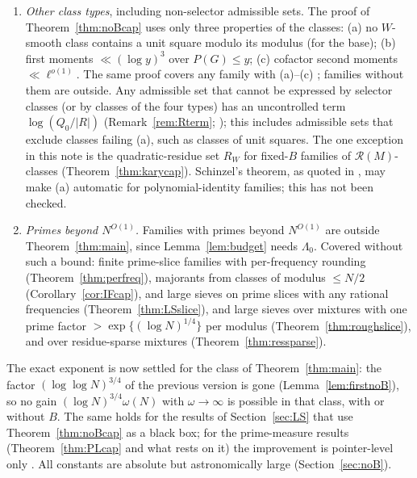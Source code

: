 \documentclass[10pt,reqno]{amsart}
\theoremstyle{definition}
\theoremstyle{remark}
\newcommand{\cR}{\mathscr R}
\begin{document}
\begin{enumerate}
  non-witness divisor information along fixed shifts, tuple counts whose
  main term is not the CRT density (any $\theta>3/4$ input of this kind
  for the prime family needs accuracy at moduli $\exp\{c(\log N)^{3\theta/2}\}$,
  see the discussion after Corollary~\ref{cor:prime23}), and family-class order $k$ in the window
  \eqref{eq:window} for families whose moduli have unboundedly many
  primes above $W$ (Corollary~\ref{cor:boundedr},
  Lemma~\ref{lem:packing}).
\item \emph{Other class types}, including non-selector admissible sets.
  The proof of Theorem~\ref{thm:noBcap} uses only three properties of
  the classes: (a) no $W$-smooth class contains a unit square modulo its
  modulus (for the base); (b) first moments $\ll(\log y)^3$ over $P(G)\leq y$;
  (c) cofactor second moments $\ll\ell^{o(1)}$.  The same proof covers any
  family with (a)--(c) \cite[\S6, item~2]{KA2}; families without them are
  outside.  Any admissible set that cannot be expressed by selector
  classes (or by classes of the four types) has an uncontrolled term
  $\log(Q_0/|R|)$ (Remark~\ref{rem:Rterm}; \cite[\S6]{ET}); this includes
  admissible sets that exclude classes failing (a), such as classes of
  unit squares.  The one exception in this note is the quadratic-residue
  set $R_W$ for fixed-$B$ families of $\cR(M)$-classes
  (Theorem~\ref{thm:karycap}).  Schinzel's theorem, as quoted in
  \cite{ElsholtzTao}, may make (a) automatic for polynomial-identity
  families; this has not been checked.
\item \emph{Primes beyond $N^{O(1)}$.}  Families with primes beyond
  $N^{O(1)}$ are outside Theorem~\ref{thm:main}, since
  Lemma~\ref{lem:budget} needs $\Lambda_0$.  Covered without such a bound:
  finite prime-slice families with per-frequency rounding
  (Theorem~\ref{thm:perfreq}), majorants from classes of modulus $\leq N/2$
  (Corollary~\ref{cor:IFcap}), and large sieves on prime slices with any
  rational frequencies (Theorem~\ref{thm:LSslice}), and large sieves over
  mixtures with one prime factor $>\exp\{(\log N)^{1/4}\}$ per modulus
  (Theorem~\ref{thm:roughslice}), and over residue-sparse mixtures
  (Theorem~\ref{thm:ressparse}).
\end{enumerate}
The exact exponent is now settled for the class of
Theorem~\ref{thm:main}: the factor $(\log\log N)^{3/4}$ of the previous
version is gone (Lemma~\ref{lem:firstnoB}), so no gain
$(\log N)^{3/4}\omega(N)$ with $\omega\to\infty$ is possible in that class, with or
without $B$.  The same holds for the results of Section~\ref{sec:LS} that
use Theorem~\ref{thm:noBcap} as a black box; for the prime-measure results
(Theorem~\ref{thm:PLcap} and what rests on it) the improvement is
pointer-level only \cite[\S4.3]{KA3}.  All constants are absolute but
astronomically large (Section~\ref{sec:noB}).
\end{document}
